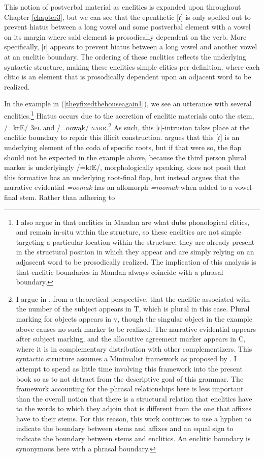 This notion of postverbal material as enclitics is expanded upon throughout Chapter \ref{chapter3}, but we can see that the epenthetic [ɾ] is only spelled out to prevent hiatus between a long vowel and some postverbal element with a vowel on its margin where said element is prosodically dependent on the verb. More specifically, [ɾ] appears to prevent hiatus between a long vowel and another vowel at an enclitic boundary. The ordering of these enclitics reflects the underlying syntactic structure, making these enclitics simple clitics per  definition, where each clitic is an element that is prosodically dependent upon an adjacent word to be realized.

In the example in (\ref{theyfixedthehouseagain1}), we see an utterance with several enclitics.\footnote{I also argue in \citet{kasak2019} that enclitics in Mandan are what \citet{anderson2005} dubs phonological clitics, and remain in-situ within the structure, so these enclitics are not simple targeting a particular location within the structure; they are already present in the structural position in which they appear and are simply relying on an adjascent word to be prosodically realized. The implication of this analysis is that enclitic boundaries in Mandan always coincide with a phrasal boundary.} Hiatus occurs due to the accretion of enclitic materials onto the stem, /=krE/ \textsc{3pl} and /=oowąk/ \textsc{narr}.\footnote{I argue in \citet{kasak2019}, from a theoretical perspective, that the enclitic associated with the number of the subject appears in T, which is plural in this case. Plural marking for objects appears in v, though the singular object in the example above causes no such marker to be realized. The narrative evidential appears after subject marking, and the allocutive agreement marker appears in C, where it is in complementary distribution with other complementizers. This syntactic structure assumes a Minimalist framework as proposed by \citet{chomsky1993,chomsky1995}. I attempt to spend as little time involving this framework into the present book so as to not detract from the descriptive goal of this grammar. The framework accounting for the phrasal relationships here is less important than the overall notion that there is a structural relation that enclitics have to the words to which they adjoin that is different from the one that affixes have to their stems. For this reason, this work continues to use a hyphen to indicate the boundary between stems and affixes and an equal sign to indicate the boundary between stems and enclitics. An enclitic boundary is synonymous here with a phrasal boundary.} As such, this [ɾ]-intrusion takes place at the enclitic boundary to repair this illicit construction. \citet{hollow1970} argues that this [ɾ] is an underlying element of the coda of specific roots, but if that were so, the flap should not be expected in the example above, because the third person plural marker is underlyingly /=kɾE/, morphologically speaking. \citeauthor{hollow1970} does not posit that this formative has an underlying root-final flap, but instead argues that the narrative evidential \textit{=oomak} has an allomorph \textit{=roomak} when added to a vowel-final stem. Rather than adhering to 